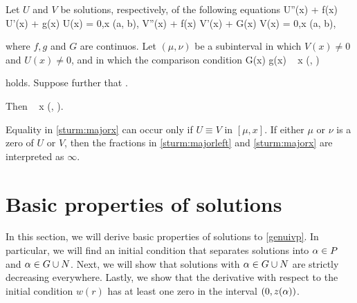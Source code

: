 \begin{theorem}
    Let $U$ and $V$ be solutions, respectively, of the following equations
    \be \label{sturm:uivp}
        U''(x) + f(x) U'(x) + g(x) U(x) = 0,\quad x \in (a, b),
    \ee
    \be \label{sturm:vivp}
        V''(x) + f(x) V'(x) + G(x) V(x) = 0,\quad x \in (a, b),
    \ee
    
    where $f, g$ and $G$ are continuos. Let $(\mu, \nu)$ be a subinterval in
    which $V(x) \neq 0$ and $U(x) \neq 0$, and in which the comparison condition 
    \be \label{sturm:compare}
        G(x) \geq g(x) \quad {} ~ x \in (\mu, \nu)
    \ee
    
    holds. Suppose further that
    \be \label{sturm:majorleft}
         \leq {}.
    \ee

    Then
    \be \label{sturm:majorx}
         \leq {}\quad {} ~ x \in
        (\mu, \nu).
    \ee

    Equality in \eqref{sturm:majorx} can occur only if $U \equiv V$ in $[\mu,
    x]$. If either $\mu$ or $\nu$ is a zero of $U$ or $V$, then the fractions in
    \eqref{sturm:majorleft} and \eqref{sturm:majorx} are interpreted as
    $\infty$. 

\end{theorem}
\endgroup

\begin{comment}
{\red In the end, we wish to show that the function $\za$ is monotone decreasing in
$\a$. Or actually, that $(\a, \a+\e)\subset N$ and if $\bar{\a}\in N$ then $\za :
[\bar{\a}, \infty)\to(0,\infty)$ is monotone decreasing.}
\end{comment}


\section{Basic properties of solutions}
\donegroup
In this section, we will derive basic properties of solutions to
\eqref{genuivp}. In particular, we will find an initial condition that
separates solutions into $\alpha \in P$ and $\alpha \in G \cup N$. Next, we will show
that solutions with $\alpha \in G \cup N$ are strictly decreasing everywhere.
Lastly, we show that the derivative with respect to the initial condition
$w(r)$ has at least one zero in the interval $(0, z(\alpha))$. 
\endgroup

